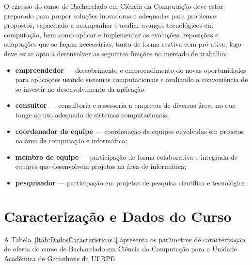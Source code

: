 \documentclass[
	12pt,				%
	openright,			%
  oneside,     %
	a4paper,			%
	english,			%
	french,				%
	spanish,			%
	brazil				%
	]{abntex2}
\begin{document}
O egresso do curso de Bacharelado em Ciência da Computação deve estar
preparado para propor soluções inovadoras e  adequadas para problemas propostos,
capacitado a acompanhar e avaliar avanços  tecnológicos em computação, bem como
aplicar e implementar as evoluções, reposições e adaptações que se façam
necessárias, tanto de forma reativa com pró-ativa, logo deve estar apto a
desenvolver as seguintes funções no mercado de trabalho:

\begin{itemize}
  \item \textbf{empreendedor} --- descobrimento e empreendimento de novas
  oportunidades para aplicações usando sistemas computacionais e avaliando a 
  conveniência de se investir no desenvolvimento da aplicação;
  \item \textbf{consultor} --- consultoria e assessoria a empresas de diversas
  áreas no que tange ao uso adequado de sistemas computacionais;
  \item \textbf{coordenador de equipe} --- coordenação de equipes envolvidas em
  projetos na área de computação e informática;
  \item \textbf{membro de equipe} --- participação de forma colaborativa e 
  integrada de equipes que desenvolvem projetos na área de informática;
  \item \textbf{pesquisador} --- participação em projetos de pesquisa científica
  e tecnológica.
\end{itemize}


%
%


\chapter{Caracterização e Dados do Curso}

A Tabela~\ref{ltab:DadosCaracteristicas1} apresenta os parâmetros de caracterização de oferta do curso de
Bacharelado em Ciência da Computação para a Unidade Acadêmica de Garanhuns da UFRPE.
\end{document}

